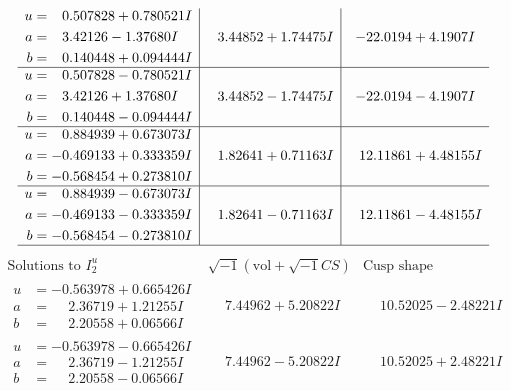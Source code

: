\documentclass[1p]{elsarticle_modified}
\theoremstyle{definition}
\newcommand{\I}{\sqrt{-1}}
\begin{document}
$$\begin{array}{c|c|c}
\begin{aligned}
u &= \phantom{-}0.507828 + 0.780521 I \\
a &= \phantom{-}3.42126 - 1.37680 I \\
b &= \phantom{-}0.140448 + 0.094444 I\end{aligned}
 & \phantom{-}3.44852 + 1.74475 I & -22.0194 + 4.1907 I \\ \hline\begin{aligned}
u &= \phantom{-}0.507828 - 0.780521 I \\
a &= \phantom{-}3.42126 + 1.37680 I \\
b &= \phantom{-}0.140448 - 0.094444 I\end{aligned}
 & \phantom{-}3.44852 - 1.74475 I & -22.0194 - 4.1907 I \\ \hline\begin{aligned}
u &= \phantom{-}0.884939 + 0.673073 I \\
a &= -0.469133 + 0.333359 I \\
b &= -0.568454 + 0.273810 I\end{aligned}
 & \phantom{-}1.82641 + 0.71163 I & \phantom{-}12.11861 + 4.48155 I \\ \hline\begin{aligned}
u &= \phantom{-}0.884939 - 0.673073 I \\
a &= -0.469133 - 0.333359 I \\
b &= -0.568454 - 0.273810 I\end{aligned}
 & \phantom{-}1.82641 - 0.71163 I & \phantom{-}12.11861 - 4.48155 I\\
 \hline 
 \end{array}$$\newpage$$\begin{array}{c|c|c}  
\text{Solutions to }I^u_{2}& \I (\text{vol} + \sqrt{-1}CS) & \text{Cusp shape}\\
 \hline 
\begin{aligned}
u &= -0.563978 + 0.665426 I \\
a &= \phantom{-}2.36719 + 1.21255 I \\
b &= \phantom{-}2.20558 + 0.06566 I\end{aligned}
 & \phantom{-}7.44962 + 5.20822 I & \phantom{-}10.52025 - 2.48221 I \\ \hline\begin{aligned}
u &= -0.563978 - 0.665426 I \\
a &= \phantom{-}2.36719 - 1.21255 I \\
b &= \phantom{-}2.20558 - 0.06566 I\end{aligned}
 & \phantom{-}7.44962 - 5.20822 I & \phantom{-}10.52025 + 2.48221 I \\ \hline\begin{aligned}

\end{aligned}
\end{array}$$
\end{document}
